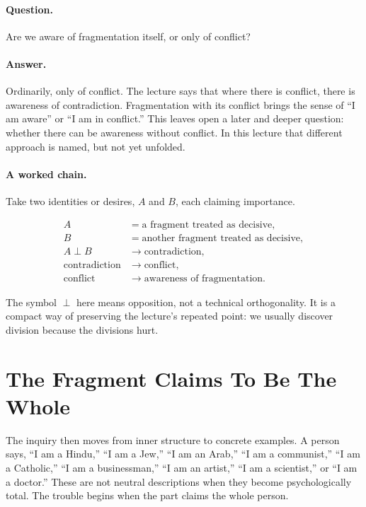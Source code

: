 \paragraph{Question.}
Are we aware of fragmentation itself, or only of conflict?

\paragraph{Answer.}
Ordinarily, only of conflict. The lecture says that where there is conflict, there is awareness of contradiction. Fragmentation with its conflict brings the sense of ``I am aware'' or ``I am in conflict.'' This leaves open a later and deeper question: whether there can be awareness without conflict. In this lecture that different approach is named, but not yet unfolded.

\paragraph{A worked chain.}
Take two identities or desires, \(A\) and \(B\), each claiming importance.

\begin{align}
A & = \text{a fragment treated as decisive}, \\
B & = \text{another fragment treated as decisive}, \\
A \perp B & \longrightarrow \text{contradiction}, \\
\text{contradiction} & \longrightarrow \text{conflict}, \\
\text{conflict} & \longrightarrow \text{awareness of fragmentation}.
\end{align}

The symbol \(\perp\) here means opposition, not a technical orthogonality. It is a compact way of preserving the lecture's repeated point: we usually discover division because the divisions hurt.

\section{The Fragment Claims To Be The Whole}

The inquiry then moves from inner structure to concrete examples. A person says, ``I am a Hindu,'' ``I am a Jew,'' ``I am an Arab,'' ``I am a communist,'' ``I am a Catholic,'' ``I am a businessman,'' ``I am an artist,'' ``I am a scientist,'' or ``I am a doctor.'' These are not neutral descriptions when they become psychologically total. The trouble begins when the part claims the whole person.

